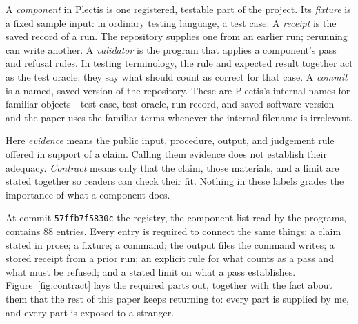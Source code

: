 \documentclass[11pt]{article}
\newcommand{\code}[1]{\texttt{#1}}
\newcommand{\snapshotshort}{57ffb7f5830c}
\newcommand{\componentcount}{88}
\begin{document}
A \emph{component} in Plectis is one registered, testable part of the
project. Its \emph{fixture} is a fixed sample input: in ordinary testing
language, a test case. A \emph{receipt} is the saved record of a run. The
repository supplies one from an earlier run; rerunning can write another.
A \emph{validator} is the program that applies a component's pass and refusal
rules. In testing terminology, the rule and expected result together act as
the test oracle: they say what should count as correct for that case. A
\emph{commit} is a named, saved version of the repository. These are Plectis's
internal names for familiar objects---test case, test oracle, run record, and
saved software version---and the paper uses the familiar terms whenever the
internal filename is irrelevant.

Here \emph{evidence} means the public input, procedure, output, and judgement
rule offered in support of a claim. Calling them evidence does not establish
their adequacy. \emph{Contract} means only that the claim, those materials,
and a limit are stated together so readers can check their fit. Nothing in
these labels grades the importance of what a component does.

At commit \code{\snapshotshort} the registry, the component list read by the
programs, contains \componentcount{} entries. Every entry is required to
connect the same things: a claim stated in prose; a fixture; a command; the
output files the command writes; a stored receipt from a prior run; an
explicit rule for what counts as a pass and what must be refused; and a
stated limit on what a pass establishes. Figure~\ref{fig:contract} lays the
required parts out, together with the fact about them that the rest of this
paper keeps returning to: every part is supplied by me, and every part is
exposed to a stranger.
\end{document}
